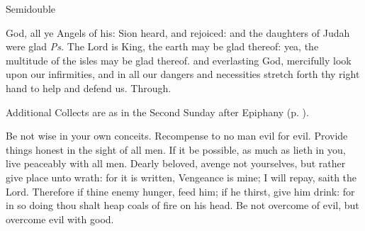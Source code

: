 \label{epiphany}
\begin{inhead}
{Semidouble}
\end{inhead}
\par\noindent
{}


\introit
{} God, all ye Angels of his: Sion heard, and rejoiced: and the daughters of Judah were glad \textit{Ps.} The Lord is King, the earth may be glad thereof: yea, the multitude of the isles may be glad thereof.
\collect
{} and everlasting God, mercifully look upon our infirmities, and in all our dangers and necessities stretch forth thy right hand to help and defend us. Through.
\begin{rubric}
    Additional Collects are as in the Second Sunday after Epiphany (p. \pageref{EpiphanyII}).
\end{rubric}
 Be not wise in your own conceits. Recompense to no man evil for evil. Provide things honest in the sight of all men. If it be possible, as much as lieth in you, live peaceably with all men. Dearly beloved, avenge not yourselves, but rather give place unto wrath: for it is written, Vengeance is mine; I will repay, saith the Lord. Therefore if thine enemy hunger, feed him; if he thirst, give him drink: for in so doing thou shalt heap coals of fire on his head. Be not overcome of evil, but overcome evil with good.
